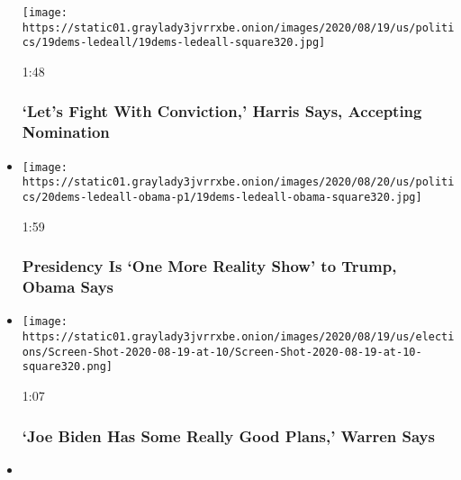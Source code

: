 \begin{itemize}
  \texttt{[image: https://static01.graylady3jvrrxbe.onion/images/2020/08/19/us/politics/19dems-ledeall/19dems-ledeall-square320.jpg]}

  1:48

  \hypertarget{lets-fight-with-conviction-harris-says-accepting-nomination}{%
  \subsubsection{`Let's Fight With Conviction,' Harris Says, Accepting
  Nomination}\label{lets-fight-with-conviction-harris-says-accepting-nomination}}
\item
  \href{https://www.nytimes3xbfgragh.onion/video/us/elections/100000007297589/barack-obama-speaks-dnc.html?action=click\&module=video-series-bar\&region=header\&pgtype=Article\&playlistId=video/latest-video}{}

  \texttt{[image: https://static01.graylady3jvrrxbe.onion/images/2020/08/20/us/politics/20dems-ledeall-obama-p1/19dems-ledeall-obama-square320.jpg]}

  1:59

  \hypertarget{presidency-is-one-more-reality-show-to-trump-obama-says}{%
  \subsubsection{Presidency Is `One More Reality Show' to Trump, Obama
  Says}\label{presidency-is-one-more-reality-show-to-trump-obama-says}}
\item
  \href{https://www.nytimes3xbfgragh.onion/video/us/elections/100000007297591/elizabeth-warren-speaks-dnc.html?action=click\&module=video-series-bar\&region=header\&pgtype=Article\&playlistId=video/latest-video}{}

  \texttt{[image: https://static01.graylady3jvrrxbe.onion/images/2020/08/19/us/elections/Screen-Shot-2020-08-19-at-10/Screen-Shot-2020-08-19-at-10-square320.png]}

  1:07

  \hypertarget{joe-biden-has-some-really-good-plans-warren-says}{%
  \subsubsection{`Joe Biden Has Some Really Good Plans,' Warren
  Says}\label{joe-biden-has-some-really-good-plans-warren-says}}
\item
  \href{https://www.nytimes3xbfgragh.onion/video/us/elections/100000007297617/nancy-pelosi-speaks-dnc.html?action=click\&module=video-series-bar\&region=header\&pgtype=Article\&playlistId=video/latest-video}{}


\end{itemize}
